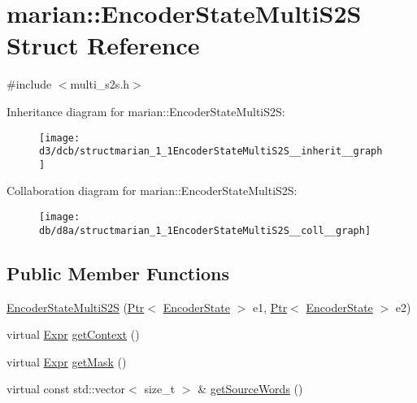 \hypertarget{structmarian_1_1EncoderStateMultiS2S}{}\section{marian\+:\+:Encoder\+State\+Multi\+S2S Struct Reference}
\label{structmarian_1_1EncoderStateMultiS2S}


{\ttfamily \#include $<$multi\+\_\+s2s.\+h$>$}



Inheritance diagram for marian\+:\+:Encoder\+State\+Multi\+S2S\+:
\nopagebreak
\begin{figure}[H]
\begin{center}
\leavevmode
\texttt{[image: d3/dcb/structmarian\_1\_1EncoderStateMultiS2S\_\_inherit\_\_graph]}
\end{center}
\end{figure}


Collaboration diagram for marian\+:\+:Encoder\+State\+Multi\+S2S\+:
\nopagebreak
\begin{figure}[H]
\begin{center}
\leavevmode
\texttt{[image: db/d8a/structmarian\_1\_1EncoderStateMultiS2S\_\_coll\_\_graph]}
\end{center}
\end{figure}
\subsection*{Public Member Functions}
\begin{DoxyCompactItemize}
\item 
\hyperlink{structmarian_1_1EncoderStateMultiS2S_a097df41a4ed9bc22d1f7c4b0ab2866a4}{Encoder\+State\+Multi\+S2S} (\hyperlink{namespacemarian_ad1a373be43a00ef9ce35666145137b08}{Ptr}$<$ \hyperlink{classmarian_1_1EncoderState}{Encoder\+State} $>$ e1, \hyperlink{namespacemarian_ad1a373be43a00ef9ce35666145137b08}{Ptr}$<$ \hyperlink{classmarian_1_1EncoderState}{Encoder\+State} $>$ e2)
\item 
virtual \hyperlink{namespacemarian_a498d8baf75b754011078b890b39c8e12}{Expr} \hyperlink{structmarian_1_1EncoderStateMultiS2S_a933874098a2871c61fc8cacff4227cd5}{get\+Context} ()
\item 
virtual \hyperlink{namespacemarian_a498d8baf75b754011078b890b39c8e12}{Expr} \hyperlink{structmarian_1_1EncoderStateMultiS2S_aa7285285787ab6c8893a1a21697472e7}{get\+Mask} ()
\item 
virtual const std\+::vector$<$ size\+\_\+t $>$ \& \hyperlink{structmarian_1_1EncoderStateMultiS2S_aef6388ca4d0187cc586d0198d136c618}{get\+Source\+Words} ()
\end{DoxyCompactItemize}

